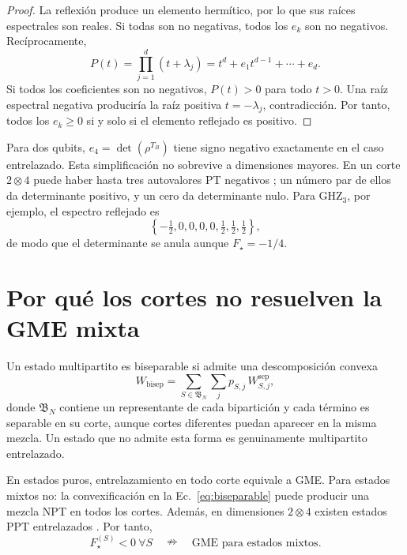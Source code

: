 \documentclass[11pt,a4paper]{article}
\newcommand{\Fstar}{F_{\star}}
\theoremstyle{definition}
\begin{document}
\begin{proof}
La reflexión produce un elemento hermítico, por lo que sus raíces espectrales
son reales. Si todas son no negativas, todos los $e_k$ son no negativos.
Recíprocamente,
\begin{equation}
 P(t)=\prod_{j=1}^{d}(t+\lambda_j)
 =t^d+e_1t^{d-1}+\cdots+e_d.
\end{equation}
Si todos los coeficientes son no negativos, $P(t)>0$ para todo $t>0$.
Una raíz espectral negativa produciría la raíz positiva
$t=-\lambda_j$, contradicción. Por tanto, todos los $e_k\geq0$ si y solo si el
elemento reflejado es positivo.
\end{proof}

Para dos qubits, $e_4=\det(\rho^{T_B})$ tiene signo negativo exactamente en el
caso entrelazado. Esta simplificación no sobrevive a dimensiones mayores. En un
corte $2\otimes4$ puede haber hasta tres autovalores PT negativos
\cite{Rana2013PartialTranspose,Johnston2013PTBound}; un número par de ellos da
determinante positivo, y un cero da determinante nulo. Para GHZ$_3$, por ejemplo,
el espectro reflejado es
\begin{equation}
 \left\{-\tfrac12,0,0,0,0,\tfrac12,\tfrac12,\tfrac12\right\},
\end{equation}
de modo que el determinante se anula aunque $\Fstar=-1/4$.

\section{Por qué los cortes no resuelven la GME mixta}

Un estado multipartito es biseparable si admite una descomposición convexa
\begin{equation}
 W_{\mathrm{bisep}}=\sum_{S\in\mathfrak B_N}\sum_j
 p_{S,j}\,W_{S,j}^{\mathrm{sep}},
 \label{eq:biseparable}
\end{equation}
donde $\mathfrak B_N$ contiene un representante de cada bipartición y cada
término es separable en su corte, aunque cortes diferentes puedan aparecer en la
misma mezcla. Un estado que no admite esta forma es genuinamente multipartito
entrelazado.

En estados puros, entrelazamiento en todo corte equivale a GME. Para estados
mixtos no: la convexificación en la Ec.~\eqref{eq:biseparable} puede producir una
mezcla NPT en todos los cortes. Además, en dimensiones $2\otimes4$ existen
estados PPT entrelazados \cite{Horodecki1997BoundEntanglement}. Por tanto,
\begin{equation}
 \Fstar^{(S)}<0\ \forall S
 \quad\nRightarrow\quad
 \text{GME para estados mixtos}.
 \label{eq:allcuts-not-gme}
\end{equation}
\end{document}
